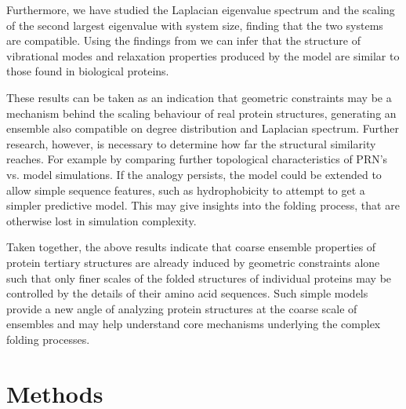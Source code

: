 \documentclass[9pt]{elife}
\begin{document}
Furthermore, we have studied the Laplacian eigenvalue spectrum and the scaling of the second largest eigenvalue with system size, finding that the two systems are compatible. Using the findings from \cite{estrada2010resistance,ren2009thermodynamic} we can infer that the structure of vibrational modes and relaxation properties produced by the model are similar to those found in biological proteins.

These results can be taken as an indication that geometric constraints may be a mechanism behind the scaling behaviour of real protein structures, generating an ensemble also compatible on degree distribution and Laplacian spectrum. Further research, however, is necessary to determine how far the structural similarity reaches. For example by comparing further topological characteristics of PRN's vs. model simulations. If the analogy persists, the model could be extended to allow simple sequence features, such as hydrophobicity to attempt to get a simpler predictive model. This may give insights into the folding process, that are otherwise lost in simulation complexity.

Taken together, the above results indicate that coarse ensemble properties of protein tertiary structures are already induced by geometric constraints alone such that only finer scales of the folded structures of individual proteins may be controlled by the details of their amino acid sequences. Such simple models provide a new angle of analyzing protein structures at the coarse scale of ensembles and may help understand core mechanisms underlying the complex folding processes. 

\section{Methods}
\end{document}
